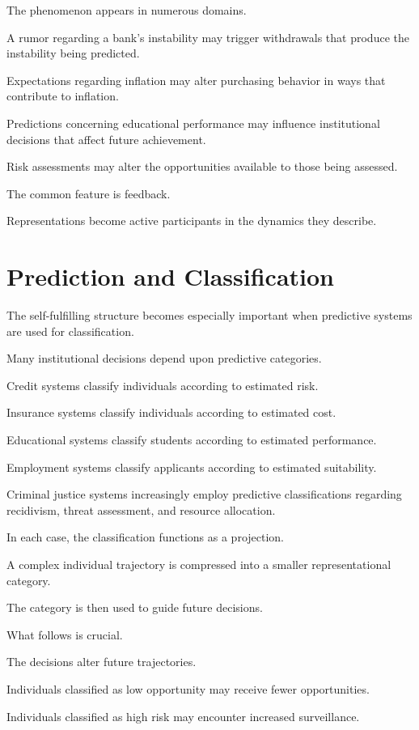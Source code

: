 \documentclass[11pt,oneside,openany]{book}
\begin{document}
The phenomenon appears in numerous domains.

A rumor regarding a bank's instability may trigger withdrawals that produce the instability being predicted.

Expectations regarding inflation may alter purchasing behavior in ways that contribute to inflation.

Predictions concerning educational performance may influence institutional decisions that affect future achievement.

Risk assessments may alter the opportunities available to those being assessed.

The common feature is feedback.

Representations become active participants in the dynamics they describe.

\section{Prediction and Classification}

The self-fulfilling structure becomes especially important when predictive systems are used for classification.

Many institutional decisions depend upon predictive categories.

Credit systems classify individuals according to estimated risk.

Insurance systems classify individuals according to estimated cost.

Educational systems classify students according to estimated performance.

Employment systems classify applicants according to estimated suitability.

Criminal justice systems increasingly employ predictive classifications regarding recidivism, threat assessment, and resource allocation.

In each case, the classification functions as a projection.

A complex individual trajectory is compressed into a smaller representational category.

The category is then used to guide future decisions.

What follows is crucial.

The decisions alter future trajectories.

Individuals classified as low opportunity may receive fewer opportunities.

Individuals classified as high risk may encounter increased surveillance.
\end{document}
